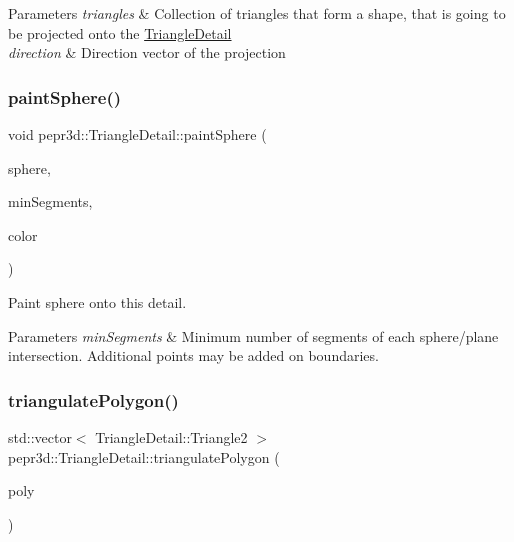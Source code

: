 \begin{DoxyParams}{Parameters}
{\em triangles} & Collection of triangles that form a shape, that is going to be projected onto the \mbox{\hyperlink{classpepr3d_1_1_triangle_detail}{Triangle\+Detail}} \\
\hline
{\em direction} & Direction vector of the projection \\
\hline
\end{DoxyParams}
\mbox{\label{classpepr3d_1_1_triangle_detail_a18e1da05e7fb8b50198a9152d238af85}} 
\subsubsection{\texorpdfstring{paintSphere()}{paintSphere()}}
{\footnotesize\ttfamily void pepr3d\+::\+Triangle\+Detail\+::paint\+Sphere (\begin{DoxyParamCaption}\item[{const Pepr\+Sphere \&}]{sphere,  }\item[{int}]{min\+Segments,  }\item[{size\+\_\+t}]{color }\end{DoxyParamCaption})}



Paint sphere onto this detail. 


\begin{DoxyParams}{Parameters}
{\em min\+Segments} & Minimum number of segments of each sphere/plane intersection. Additional points may be added on boundaries. \\
\hline
\end{DoxyParams}
\mbox{\label{classpepr3d_1_1_triangle_detail_a8409d1df8edf713beaf1743c0399c6d4}} 
\subsubsection{\texorpdfstring{triangulatePolygon()}{triangulatePolygon()}}
{\footnotesize\ttfamily std\+::vector$<$ Triangle\+Detail\+::\+Triangle2 $>$ pepr3d\+::\+Triangle\+Detail\+::triangulate\+Polygon (\begin{DoxyParamCaption}\item[{const Polygon\+With\+Holes \&}]{poly }\end{DoxyParamCaption})\hspace{0.3cm}{\ttfamily [static]}}



